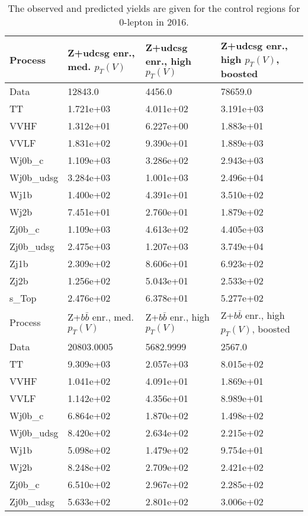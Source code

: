 \begin{table}
\centering
\caption[2016 0-lepton control region yields]{
                  The observed and predicted yields are given for the
                  control regions for 0-lepton in 2016.
                  }
{\footnotesize
\begin{tabularx}{0.8\textwidth}{|X|X|X|X|}
\hline
Process & Z+udcsg enr., med. $p_{T}(V)$ & Z+udcsg enr., high $p_{T}(V)$ & Z+udcsg enr., high $p_{T}(V)$, boosted \\
\hline
Data & 12843.0 & 4456.0 & 78659.0 \\
\hline
TT & 1.721e+03 & 4.011e+02 & 3.191e+03 \\
VVHF & 1.312e+01 & 6.227e+00 & 1.883e+01 \\
VVLF & 1.831e+02 & 9.390e+01 & 1.889e+03 \\
Wj0b\_c & 1.109e+03 & 3.286e+02 & 2.943e+03 \\
Wj0b\_udsg & 3.284e+03 & 1.001e+03 & 2.496e+04 \\
Wj1b & 1.400e+02 & 4.391e+01 & 3.510e+02 \\
Wj2b & 7.451e+01 & 2.760e+01 & 1.879e+02 \\
Zj0b\_c & 1.109e+03 & 4.613e+02 & 4.405e+03 \\
Zj0b\_udsg & 2.475e+03 & 1.207e+03 & 3.749e+04 \\
Zj1b & 2.309e+02 & 8.606e+01 & 6.923e+02 \\
Zj2b & 1.256e+02 & 5.043e+01 & 2.533e+02 \\
s\_Top & 2.476e+02 & 6.378e+01 & 5.277e+02 \\
\hline
\hline
Process & Z+$b\bar{b}$ enr., med. $p_{T}(V)$ & Z+$b\bar{b}$ enr., high $p_{T}(V)$ & Z+$b\bar{b}$ enr., high $p_{T}(V)$, boosted \\
\hline
Data & 20803.0005 & 5682.9999 & 2567.0 \\
\hline
TT & 9.309e+03 & 2.057e+03 & 8.015e+02 \\
VVHF & 1.041e+02 & 4.091e+01 & 1.869e+01 \\
VVLF & 1.142e+02 & 4.356e+01 & 8.989e+01 \\
Wj0b\_c & 6.864e+02 & 1.870e+02 & 1.498e+02 \\
Wj0b\_udsg & 8.420e+02 & 2.634e+02 & 2.215e+02 \\
Wj1b & 5.098e+02 & 1.479e+02 & 9.754e+01 \\
Wj2b & 8.248e+02 & 2.709e+02 & 2.421e+02 \\
Zj0b\_c & 6.510e+02 & 2.967e+02 & 2.285e+02 \\
Zj0b\_udsg & 5.633e+02 & 2.801e+02 & 3.006e+02 \\

\end{tabularx}}
\end{table}
